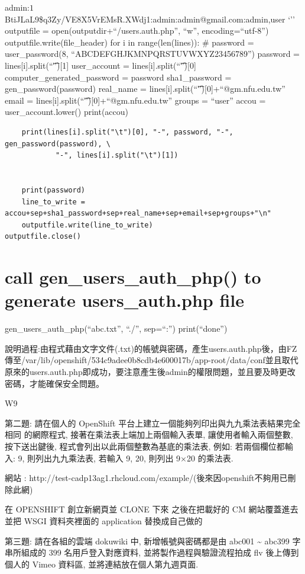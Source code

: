 \documentclass[]{article}
\begin{document}
admin:$1$BtiJLaL9\$q3Zy/VE8X5VrEMsR.XWdj1:admin:admin@gmail.com:admin,user
`'' outputfile = open(outputdir+``/users.auth.php'', ``w'',
encoding=``utf-8'') outputfile.write(file\_header) for i in
range(len(lines)): \# password = user\_password(8,
``ABCDEFGHJKMNPQRSTUVWXYZ23456789'') password =
lines{[}i{]}.split(``\t''){[}1{]} user\_account =
lines{[}i{]}.split(``\t''){[}0{]} computer\_generated\_password =
password sha1\_password = gen\_password(password) real\_name =
lines{[}i{]}.split(``\t''){[}0{]}+``@gm.nfu.edu.tw'' email =
lines{[}i{]}.split(``\t''){[}0{]}+``@gm.nfu.edu.tw'' groups = ``user''
accou = user\_account.lower() print(accou)

\begin{verbatim}
    print(lines[i].split("\t")[0], "-", password, "-", gen_password(password), \
            "-", lines[i].split("\t")[1])
            

    print(password)
    line_to_write = accou+sep+sha1_password+sep+real_name+sep+email+sep+groups+"\n"
    outputfile.write(line_to_write)
outputfile.close()
\end{verbatim}

\section{call gen\_users\_auth\_php() to generate users\_auth.php
file}\label{call-genux5fusersux5fauthux5fphp-to-generate-usersux5fauth.php-file}

gen\_users\_auth\_php(``abc.txt'', ``./'', sep=``:'') print(``done'')

說明過程:由程式藉由文字文件(.txt)的帳號與密碼，產生users.auth.php後，由FZ傳至/var/lib/openshift/534c9adee0b8cdb4e600017b/app-root/data/conf並且取代原來的users.auth.php即成功，要注意產生後admin的權限問題，並且要及時更改密碼，才能確保安全問題。

W9

第二題: 請在個人的 OpenShift
平台上建立一個能夠列印出與九九乘法表結果完全相同 的網際程式,
接著在乘法表上端加上兩個輸入表單, 讓使用者輸入兩個整數, 按下送出鍵後,
程式會列出以此兩個整數為基底的乘法表, 例如: 若兩個欄位都輸入: 9,
則列出九九乘法表, 若輸入 9, 20, 則列出 9×20 的乘法表.

網站 :
http://test-cadp13ag1.rhcloud.com/example/(後來因openshift不夠用已刪除此網)

在 OPENSHIFT 創立新網頁並 CLONE 下來 之後在把載好的 CM 網站覆蓋進去 並把
WSGI 資料夾裡面的 application 替換成自己做的

第三題: 請在各組的雲端 dokuwiki 中, 新增帳號與密碼都是由 abc001
\textasciitilde{} abc399 字串所組成的 399 名用戶登入對應資料,
並將製作過程與驗證流程拍成 flv 後上傳到個人的 Vimeo 資料區,
並將連結放在個人第九週頁面.
\end{document}

